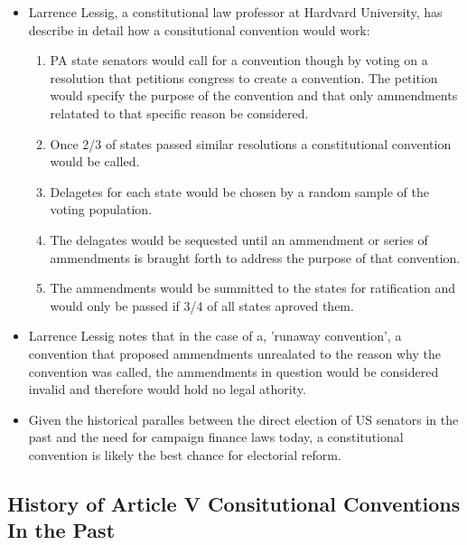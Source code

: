 \documentclass[11pt]{article} %
\begin{document}
\begin{itemize}

\item Larrence Lessig, a constitutional law professor at Hardvard University, has describe in detail how a consitutional convention would work:

\begin{enumerate}
	
\item  PA state senators would call for a convention though by voting on a resolution that petitions congress to create a convention. The petition would specify the purpose of the convention and that only ammendments relatated to that specific reason be considered. 

\item  Once 2/3 of states passed similar resolutions a constitutional convention would be called.

\item    Delagetes for each state would be chosen by a random sample of the voting population.

\item  The delagates would be sequested until an ammendment or series of ammendments is braught forth to address the purpose of that convention. 

\item The ammendments would be summitted to the states for ratification and would only be passed if 3/4 of all states aproved them. 

\end{enumerate}

\item Larrence Lessig notes that in the case of a, 'runaway convention', a convention that proposed ammendments unrealated to the reason why the convention was called, the ammendments in question would be considered invalid and therefore would hold no legal athority. 

\item Given the historical paralles between the direct election of US senators in the past and the need for campaign finance laws today, a constitutional convention is likely the best chance for electorial reform. 

\end{itemize}



\subsection{History of Article V Consitutional Conventions In the Past}
\end{document}

